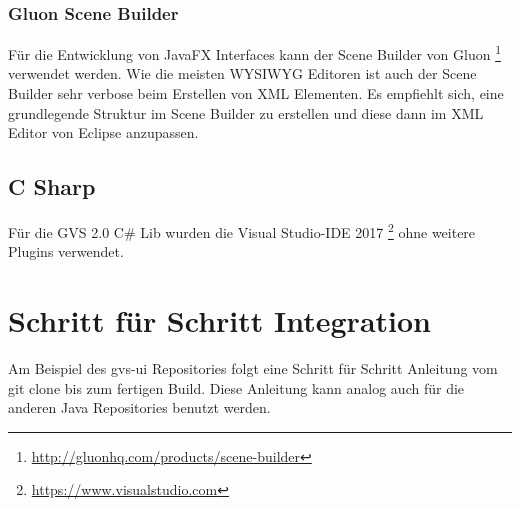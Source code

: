 \documentclass[11pt,a4paper,english,oneside]{book}
\numberwithin{equation}{chapter}
\begin{document}
	\subsubsection{Gluon Scene Builder}
	Für die Entwicklung von JavaFX Interfaces kann der Scene Builder von Gluon \footnote{\url{http://gluonhq.com/products/scene-builder}} verwendet werden.  Wie die meisten WYSIWYG Editoren ist auch der Scene Builder sehr verbose beim Erstellen von XML Elementen. Es empfiehlt sich, eine grundlegende Struktur im Scene Builder zu erstellen und diese dann im XML Editor von Eclipse anzupassen.

	\subsection{C Sharp}
	Für die GVS 2.0 C\# Lib wurden die Visual Studio-IDE 2017 \footnote{\url{https://www.visualstudio.com}} ohne weitere Plugins verwendet.

	\clearpage
	
	\section{Schritt für Schritt Integration}
	Am Beispiel des gvs-ui Repositories folgt eine Schritt für Schritt Anleitung vom git clone bis zum fertigen Build. Diese Anleitung kann analog auch für die anderen Java Repositories benutzt werden.
	
\end{document}
